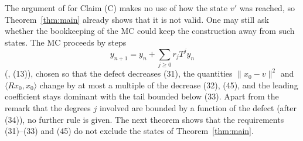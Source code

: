 \documentclass[11pt]{article}
\theoremstyle{definition}
\newcommand{\ip}[2]{\langle #1,#2\rangle}
\newcommand{\norm}[1]{\lVert #1\rVert}
\begin{document}
The argument of \cite{E} for Claim (C) makes no use of how the state $v'$ was reached, so
Theorem~\ref{thm:main} already shows that it is not valid. One may still ask whether the
bookkeeping of the MC could keep the construction away from such states. The MC proceeds by
steps
\begin{equation}\label{eq:step}
y_{n+1}=y_n+\sum_{j\ge0}r_jT^jy_n
\end{equation}
\textup{(\cite{E}, (13))}, chosen so that the defect decreases \textup{(31)}, the quantities
$\norm{x_0-v}^2$ and $\ip{Rx_0}{x_0}$ change by at most a multiple of the decrease
\textup{(32), (45)}, and the leading coefficient stays dominant with the tail bounded below
\textup{(33)}. Apart from the remark that the degrees $j$ involved are bounded by a function
of the defect \textup{(after (34))}, no further rule is given. The next theorem shows that the
requirements \textup{(31)--(33)} and \textup{(45)} do not exclude the states of
Theorem~\ref{thm:main}.
\end{document}
